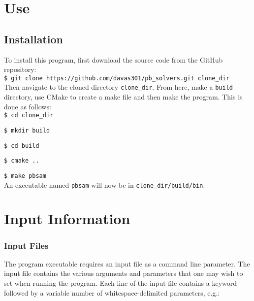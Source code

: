 \clearpage


\section{Use}

\subsection{Installation}

To install this program, first download the source code from the GitHub repository: \\

\hspace{1cm}\texttt{\$ git clone https://github.com/davas301/pb\_solvers.git clone\_dir} \\

Then navigate to the cloned directory \texttt{clone\_dir}. From here, make a \texttt{build} directory, use CMake to create a make file and then make the program.  This is done as follows: \\

\hspace{1cm}\texttt{\$ cd clone\_dir} 

\hspace{1cm}\texttt{\$ mkdir build}

\hspace{1cm}\texttt{\$ cd build}

\hspace{1cm}\texttt{\$ cmake ..} 

\hspace{1cm}\texttt{\$ make pbsam} \\

An executable named \texttt{pbsam} will now be in \texttt{clone\_dir/build/bin}.

\section{Input Information}

\subsubsection{Input Files}

The program executable requires an input file as a command line parameter. The input file contains the various arguments and parameters that one may wish to set when running the program. Each line of the input file contains a keyword followed by a variable number of whitespace-delimited parameters, e.g.: \\

